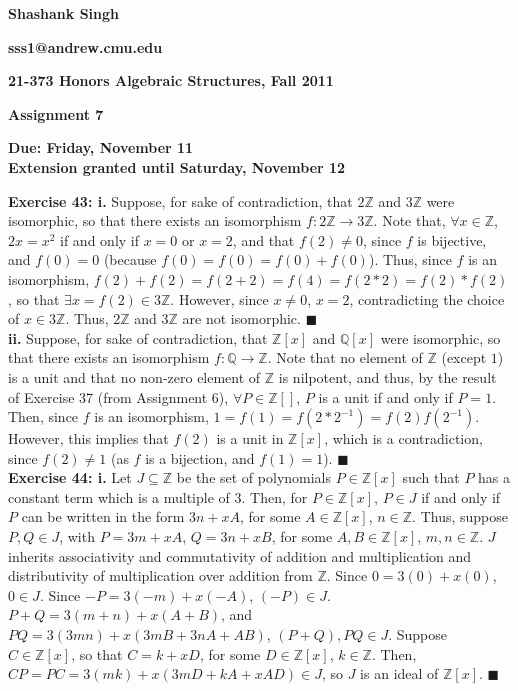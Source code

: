 \documentclass{article}%
\begin{document}
\begin{center}
\textbf{Shashank Singh}

\textbf{sss1@andrew.cmu.edu}

\textbf{21-373 \quad Honors Algebraic Structures, Fall 2011}

\textbf{Assignment 7}

\textbf{Due: Friday, November 11}\\

\textbf{Extension granted until Saturday, November 12}
\end{center}

\textbf{Exercise 43: i.} Suppose, for sake of contradiction, that
$2\mathbb{Z}$ and $3\mathbb{Z}$ were isomorphic, so that there exists an
isomorphism $f: 2\mathbb{Z} \rightarrow 3\mathbb{Z}$. Note that, $\forall x
\in \mathbb{Z}$, $2x = x^2$ if and only if $x = 0$ or $x = 2$, and that $f(2)
 \neq 0$, since $f$ is bijective, and $f(0) = 0$ (because $f(0) = f(0) 
= f(0) + f(0)$). Thus, since $f$ is an isomorphism, $f(2) + f(2) = f(2 + 2) =
f(4) = f(2*2) = f(2)*f(2)$, so that $\exists x = f(2) \in 3\mathbb{Z}$.
However, since $x \neq 0$, $x = 2$, contradicting the choice of $x \in
3\mathbb{Z}$. Thus, $2\mathbb{Z}$ and $3\mathbb{Z}$ are not isomorphic.
\qquad $\blacksquare$ \\

\textbf{ii.} Suppose, for sake of contradiction, that $\mathbb{Z}[x]$ and
$\mathbb{Q}[x]$ were isomorphic, so that there exists an isomorphism $f:
\mathbb{Q} \rightarrow \mathbb{Z}$. Note that no element of $\mathbb{Z}$
(except $1$) is a unit and that no non-zero element of $\mathbb{Z}$ is
nilpotent, and thus, by the result of Exercise 37 (from Assignment 6),
$\forall P \in \mathbb{Z}[]$, $P$ is a unit if and only if $P = 1$. Then,
since $f$ is an isomorphism, $1 = f(1) = f(2*2^{-1}) = f(2)f(2^{-1})$.
However, this implies that $f(2)$ is a unit in $\mathbb{Z}[x]$, which is
a contradiction, since $f(2) \neq 1$ (as $f$ is a bijection, and $f(1) = 1$).
\qquad $\blacksquare$ \\

\textbf{Exercise 44: i.} Let $J \subseteq \mathbb{Z}$ be the set of
polynomials $P \in \mathbb{Z}[x]$ such that $P$ has a constant term which is a
multiple of $3$. Then, for $P \in \mathbb{Z}[x]$, $P \in J$ if and only if $P$
can be written in the form $3n + xA$, for some $A \in \mathbb{Z}[x]$,
$n \in \mathbb{Z}$. Thus, suppose $P, Q \in J$, with $P = 3m + xA$,
$Q = 3n + xB$, for some
$A, B \in \mathbb{Z}[x]$, $m,n \in \mathbb{Z}$. $J$ inherits associativity and
commutativity of addition and multiplication and distributivity of
multiplication over addition from $\mathbb{Z}$. Since $0 = 3(0) + x(0)$,
$0 \in J$. Since $-P = 3(-m) + x(-A)$, $(-P) \in J$. $P + Q = 3(m + n) +
x(A + B)$, and $PQ = 3(3mn) + x(3mB + 3nA + AB)$, $(P + Q), PQ \in J$. Suppose
$C \in \mathbb{Z}[x]$, so that $C = k + xD$, for some $D \in \mathbb{Z}[x]$,
$k \in \mathbb{Z}$. Then, $CP = PC = 3(mk) + x(3mD + kA + xAD) \in J$, so $J$
is an ideal of $\mathbb{Z}[x]$. \qquad $\blacksquare$ \\
\end{document}

